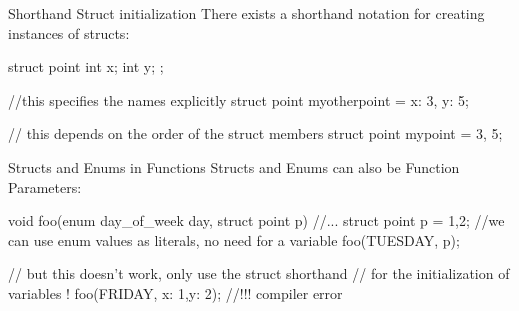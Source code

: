 \documentclass[10pt,graphics,aspectratio=169,table]{beamer}
\begin{document}
\begin{frame}[fragile]{Shorthand Struct initialization}
    There exists a shorthand notation for creating instances of structs:
    \begin{codeblock}
        struct point{
            int x;
            int y;
        }; 
        
        //this specifies the names explicitly
        struct point myotherpoint = {x: 3, y: 5};

        // this depends on the order of the struct members
        struct point mypoint = {3, 5};
    \end{codeblock}

\end{frame}

\begin{frame}[fragile]{Structs and Enums in Functions}
    Structs and Enums can also be Function Parameters:
    \begin{codeblock}
void foo(enum day_of_week day, struct point p){ 
    //...
}
struct point p = {1,2};
//we can use enum values as literals, no need for a variable
foo(TUESDAY, p); 

// but this doesn't work, only use the struct shorthand
// for the initialization of variables !
foo(FRIDAY, {x: 1,y: 2}); //!!! compiler error
    \end{codeblock}
\end{frame}
  
\end{document}
